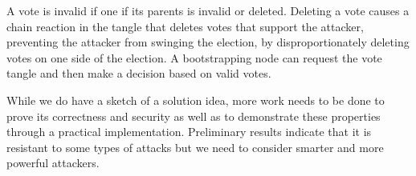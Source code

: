 

A vote is invalid if one if its parents is invalid or deleted.
Deleting a vote causes a chain reaction in the tangle that deletes votes that support the attacker, preventing the attacker from swinging the election, by disproportionately deleting votes on one side of the election.
A bootstrapping node can request the vote tangle and then make a decision based on valid votes.

While we do have a sketch of a solution idea, more work needs to be done to prove its correctness and security as well as to demonstrate these properties through a practical implementation.
Preliminary results indicate that it is resistant to some types of attacks but we need to consider smarter and more powerful attackers.

